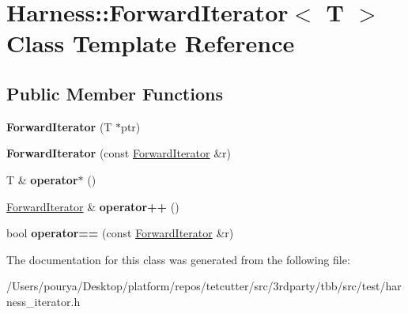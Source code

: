 \hypertarget{classHarness_1_1ForwardIterator}{}\section{Harness\+:\+:Forward\+Iterator$<$ T $>$ Class Template Reference}
\label{classHarness_1_1ForwardIterator}
\subsection*{Public Member Functions}
\begin{DoxyCompactItemize}
\item 
\hypertarget{classHarness_1_1ForwardIterator_a7535671603130bff55f6127eaac39e3a}{}{\bfseries Forward\+Iterator} (T $\ast$ptr)\label{classHarness_1_1ForwardIterator_a7535671603130bff55f6127eaac39e3a}

\item 
\hypertarget{classHarness_1_1ForwardIterator_a4078a46b9bc9428ab7f1f00530830555}{}{\bfseries Forward\+Iterator} (const \hyperlink{classHarness_1_1ForwardIterator}{Forward\+Iterator} \&r)\label{classHarness_1_1ForwardIterator_a4078a46b9bc9428ab7f1f00530830555}

\item 
\hypertarget{classHarness_1_1ForwardIterator_ae1063ddbe9072e5ea92cb0895e983d7f}{}T \& {\bfseries operator$\ast$} ()\label{classHarness_1_1ForwardIterator_ae1063ddbe9072e5ea92cb0895e983d7f}

\item 
\hypertarget{classHarness_1_1ForwardIterator_a7c2572c5b9b3de20755c939a357505c4}{}\hyperlink{classHarness_1_1ForwardIterator}{Forward\+Iterator} \& {\bfseries operator++} ()\label{classHarness_1_1ForwardIterator_a7c2572c5b9b3de20755c939a357505c4}

\item 
\hypertarget{classHarness_1_1ForwardIterator_ae633aad2abfdccc4137670f82ba6d7d5}{}bool {\bfseries operator==} (const \hyperlink{classHarness_1_1ForwardIterator}{Forward\+Iterator} \&r)\label{classHarness_1_1ForwardIterator_ae633aad2abfdccc4137670f82ba6d7d5}

\end{DoxyCompactItemize}


The documentation for this class was generated from the following file\+:\begin{DoxyCompactItemize}
\item 
/\+Users/pourya/\+Desktop/platform/repos/tetcutter/src/3rdparty/tbb/src/test/harness\+\_\+iterator.\+h\end{DoxyCompactItemize}
